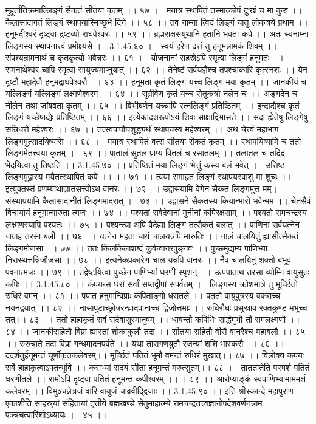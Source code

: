 मुहूर्तातिक्रमाल्लिङ्गं सैकतं सीतया कृतम् ।। ५७ ।।
मयात्र स्थापितं तस्मात्कोपं दुःखं च मा कुरु ।।
कैलासादागतं लिङ्गं स्थापयास्मिच्छुभे दिने ।। ५८ ।।
तव नाम्ना त्विदं लिङ्गं यातु लोकत्रये प्रथाम् ।।
हनूमदीश्वरं दृष्ट्वा द्रष्टव्यो राघवेश्वरः ।। ५९ ।।
ब्रह्मराक्षसयूथानि हतानि भवता कपे ।।
अतः स्वनाम्ना लिङ्गस्य स्थापनात्त्वं प्रमोक्ष्यसे ।। 3.1.45.६० ।।
स्वयं हरेण दत्तं तु हनूमन्नामकं शिवम् ।।
संपश्यन्रामनाथं च कृतकृत्यो भवेन्नरः ।। ६१ ।।
योजनानां सहस्रेऽपि स्मृत्वा लिङ्गं हनूमतः ।।
रामनाथेश्वरं चापि स्मृत्वा सायुज्यमाप्नुयात् ।। ६२ ।।
तेनेष्टं सर्वयज्ञैश्च तपश्चाकारि कृत्स्नशः ।।
येन दृष्टौ महादेवौ हनूमद्राघवेश्वरौ ।। ६३ ।।
हनूमता कृतं लिङ्गं यच्च लिङ्गं मया कृतम् ।।
जानकीयं च यल्लिङ्गं यल्लिङ्गं लक्ष्मणेश्वरम् ।। ६४ ।।
सुग्रीवेण कृतं यच्च सेतुकर्त्रा नलेन च ।।
अङ्गदेन च नीलेन तथा जांबवता कृतम् ।। ६५ ।।
विभीषणेन यच्चापि रत्नलिङ्गं प्रतिष्ठितम् ।।
इन्द्राद्यैश्च कृतं लिङ्गं यच्छेषाद्यैः प्रतिष्ठितम् ।। ६६ ।।
इत्येकादशरूपोऽयं शिवः साक्षाद्विभासते ।।
सदा ह्येतेषु लिङ्गेषु सन्निधत्ते महेश्वरः ।। ६७ ।।
तत्स्वपापौघशुद्ध्यर्थं स्थापयस्व महेश्वरम् ।।
अथ चेत्त्वं महाभाग लिङ्गमुत्सादयिष्यसि ।। ६८ ।।
मयात्र स्थापितं वत्स सीतया सैकतं कृतम् ।।
स्थापयिष्यामि च ततो लिङ्गमेतत्त्वया कृतम् ।। ६९ ।।
पातालं सुतलं प्राप्य वितलं च रसातलम् ।।
तलातलं च तदिदं भेदयित्वा तु तिष्ठति ।। 3.1.45.७० ।।
प्रतिष्ठितं मया लिङ्गं भेत्तुं कस्य बलं भवेत् ।।
उत्तिष्ठ लिङ्गमुद्वास्य मयैतत्स्थापितं कपे ।। ।। ७१ ।।
त्वया समाहृतं लिङ्गं स्थापयस्वाशु मा शुचः ।।
इत्युक्तस्तं प्रणम्याथाज्ञातसत्त्वोऽथ वानरः ।। ७२ ।।
उद्वासयामि वेगेन सैकतं लिङ्गमुत्त मम्।।
संस्थापयामि कैलासादानीतं लिङ्गमादरात् ।। ७३ ।।
उद्वासने सैकतस्य कियान्भारो भवेन्मम ।।
चेतसैवं विचार्यायं हनूमान्मारुता त्मजः ।। ७४ ।।
पश्यतां सर्वदेवानां मुनीनां कपिरक्षसाम् ।।
पश्यतो रामचन्द्रस्य लक्ष्मणस्यापि पश्यतः ।। ७५ ।।
पश्यन्त्या अपि वैदेह्या लिङ्गं तत्सैकतं बलात् ।।
पाणिना सर्वयत्नेन जग्राह तरसा बली ।। ७६ ।।
यत्नेन महता चायं चालयन्नपि मारुतिः ।।
नालं चालयितुं ह्यासीत्सैकतं लिङ्गमोजसा ।। ७७ ।।
ततः किलकिलाशब्दं कुर्वन्वानरपुङ्गवः ।।
पुच्छमुद्यम्य पाणिभ्यां निरास्थत्तन्निजौजसा ।। ७८ ।।
इत्यनेकप्रकारेण चाल यन्नपि वानरः ।।
नैव चालयितुं शक्तो बभूव पवनात्मजः ।। ७९ ।।
तद्वेष्टयित्वा पुच्छेन पाणिभ्यां धरणीं स्पृशन् ।।
उत्पपाताथ तरसा व्योम्नि वायुसुतः कपिः ।। 3.1.45.८० ।।
कंपयन्स धरां सर्वां सप्तद्वीपां सपर्वतम् ।।
लिङ्गस्य क्रोशमात्रे तु मूर्च्छितो रुधिरं वमन् ।। ८१ ।।
पपात हनुमान्विप्राः कंपिताङ्गो धरातले ।।
पततो वायुपुत्रस्य वक्त्राच्च नयनद्वयात् ।। ८२ ।।
नासापुटाच्छ्रोत्ररन्ध्रादपानाच्च द्विजोत्तमाः ।।
रुधिरौघः प्रसुस्राव रक्तकुण्ड मभूच्च तत्।। ८३ ।।
ततो हाहाकृतं सर्वं सदेवासुरमानुषम् ।।
धावन्तौ कपिभिः सार्द्धमुभौ तौ रामलक्ष्मणौ ।। ८४ ।।
जानकीसहितौ विप्रा ह्यास्तां शोकाकुलौ तदा ।।
सीतया सहितौ वीरौ वानरैश्च महाबलौ ।। ८५ ।।
रुरुचाते तदा विप्रा गन्धमादनपर्वते ।।
यथा तारागणयुतौ रजन्यां शशि भास्करौ ।। ८६ ।।
ददर्शतुर्हनूमन्तं चूर्णीकृतकलेवरम्।।
मूर्च्छितं पतितं भूमौ वमन्तं रुधिरं मुखात्।। ८७ ।।
विलोक्य कपयः सर्वे हाहाकृत्वाऽपतन्भुवि ।।
कराभ्यां सदयं सीता हनूमन्तं मरुत्सुतम्।। ८८ ।।
ताततातेति पस्पर्श पतितं धरणीतले ।।
रामोऽपि दृष्ट्वा पतितं हनूमन्तं कपीश्वरम् ।। । ८९ ।।
आरोप्याङ्कं स्वपाणिभ्यामाममर्श कलेवरम् ।।
विमुञ्चन्नेत्रजं वारि वायुजं चाव्रवीद्द्विजाः ।। 3.1.45.९० ।।
इति श्रीस्कान्दे महापुराण एकाशीति साहस्र्यां संहितायां तृतीये ब्रह्मखण्डे सेतुमाहात्म्ये रामचन्द्रतत्त्वज्ञानोपदेशवर्णनन्नाम पञ्चचत्वारिंशोऽध्यायः ।। ४५ ।।


